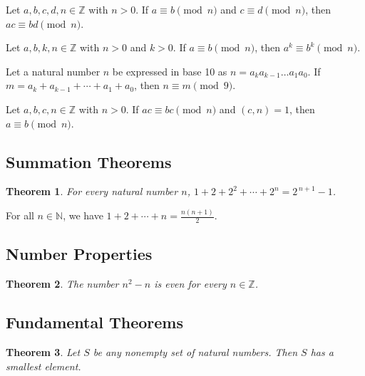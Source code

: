 \documentclass{article}
\newtheorem*{theorem*}{Theorem}
\theoremstyle{definition}
\newenvironment{manualtheorem}[1]{%
  \renewcommand{\thetheorem}{#1}%
  \theorem%
}{%
  \endtheorem%
}
\begin{document}
\begin{manualtheorem}{1.14}
	Let $a, b, c, d, n \in \mathbb{Z}$ with $n > 0$. If $a \equiv b \pmod{n}$ and $c \equiv d \pmod{n}$, then $ac \equiv bd \pmod{n}$.
\end{manualtheorem}

\begin{manualtheorem}{1.18}
	Let $a, b, k, n \in \mathbb{Z}$ with $n > 0$ and $k > 0$. If $a \equiv b \pmod{n}$, then $a^k \equiv b^k \pmod{n}$.
\end{manualtheorem}

\begin{manualtheorem}{1.21}
	Let a natural number $n$ be expressed in base 10 as $n = a_ka_{k-1}\ldots a_1a_0$. If $m = a_k + a_{k-1} + \cdots + a_1 + a_0$, then $n \equiv m \pmod{9}$.
\end{manualtheorem}

\begin{manualtheorem}{1.45}
	Let $a, b, c, n \in \mathbb{Z}$ with $n>0$. If $ac \equiv bc \pmod{n}$ and $(c,n)=1$, then $a \equiv b \pmod{n}$.
\end{manualtheorem}

\subsection{Summation Theorems}

\begin{theorem*}
	For every natural number $n$, $1 + 2 + 2^{2} + \cdots + 2^{n} = 2^{\,n+1}-1$.
\end{theorem*}

\begin{manualtheorem}{A.1}
	For all $n \in \mathbb{N}$, we have $1 + 2 + \cdots + n = \frac{n(n+1)}{2}$.
\end{manualtheorem}

\subsection{Number Properties}

\begin{theorem*}
	The number $n^2 - n$ is even for every $n \in \mathbb{Z}$.
\end{theorem*}

\subsection{Fundamental Theorems}

\begin{theorem*}
	Let $S$ be any nonempty set of natural numbers. Then $S$ has a smallest element.
\end{theorem*}
\end{document}
